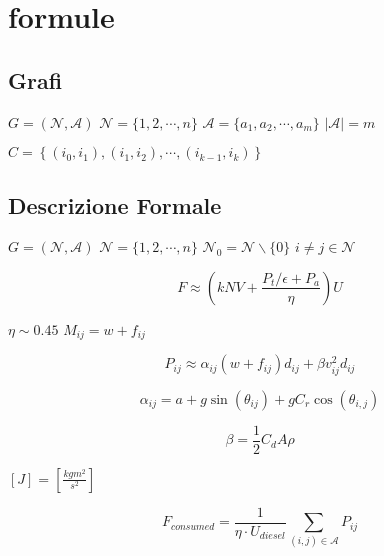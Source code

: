 \documentclass{article}
\begin{document}
	\section{formule} %
	\label{sec:formule}

		\subsection{Grafi} %
		\label{sub:grafi}
			
			$G = (\mathcal{N},\mathcal{A})$
			$\mathcal{N} = \{1, 2, \cdots, n\}$
			$\mathcal{A} = \{a_1, a_2, \cdots, a_m\}$
			$|\mathcal{A}| = m$

			$C = \left\{ (i_0,i_1), (i_1,i_2), \cdots, (i_{k-1}, i_k) \right\}$

		\subsection{Descrizione Formale} %
		\label{sub:descrizione_formale}
			
			$G = (\mathcal{N},\mathcal{A})$
			$\mathcal{N} = \{1, 2, \cdots, n\}$
			$\mathcal{N}_0 = \mathcal{N} \backslash \{0\}$
			$i \neq j \in \mathcal{N}$

			\begin{equation}
				\label{eq:fuel_consumption}
				F \approx \left( kNV + \frac{P_t \slash \epsilon + P_a}{\eta} \right) U
			\end{equation}

			$\eta \sim 0.45$
			$M_{ij} = w + f_{ij}$

			\begin{equation}
				\label{eq:energy_approx}
				P_{ij} \approx \alpha_{ij}(w + f_{ij})d_{ij} + \beta v_{ij}^2 d_{ij}
			\end{equation}

			\begin{equation}
				\label{eq:slope_param}
				\alpha_{ij} = a + g\sin(\theta_{ij}) + gC_r \cos(\theta_{i,j})
			\end{equation}

			\begin{equation}
				\label{eq:vehicle_param}
				\beta = \frac{1}{2}C_d A \rho
			\end{equation}

			$[J] = \left[ \frac{kg m^2}{s^2} \right]$

			\begin{equation}
				\label{eq:fuel_consumed}
				F_{consumed} = \frac{1}{\eta \cdot U_{diesel}} \sum_{(i,j) \in \mathcal{A}} P_{ij} 
			\end{equation}
\end{document}
